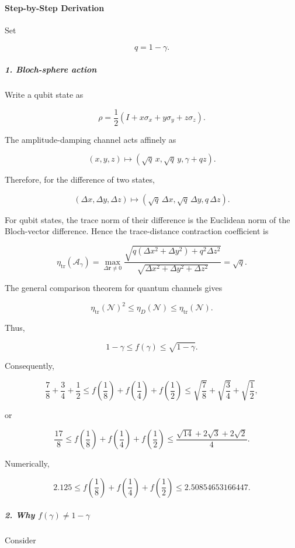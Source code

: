 \documentclass[11pt]{article}
\begin{document}
\paragraph*{Step-by-Step Derivation}

Set

\[
q=1-\gamma.
\]

\subparagraph*{1. Bloch-sphere action}

Write a qubit state as

\[
\rho=\frac12\left(I+x\sigma_x+y\sigma_y+z\sigma_z\right).
\]

The amplitude-damping channel acts affinely as

\[
(x,y,z)\longmapsto \left(\sqrt q\,x,\sqrt q\,y,\gamma+qz\right).
\]

Therefore, for the difference of two states,

\[
(\Delta x,\Delta y,\Delta z) \longmapsto \left(\sqrt q\,\Delta x,\sqrt q\,\Delta y,q\,\Delta z\right).
\]

For qubit states, the trace norm of their difference is the Euclidean norm of the Bloch-vector difference. Hence the trace-distance contraction coefficient is

\[
\eta_{\mathrm{tr}}(\mathcal A_\gamma) = \max_{\Delta\mathbf r\ne0} \frac{\sqrt{q(\Delta x^2+\Delta y^2)+q^2\Delta z^2}} {\sqrt{\Delta x^2+\Delta y^2+\Delta z^2}} =\sqrt q.
\]

The general comparison theorem for quantum channels gives

\[
\eta_{\mathrm{tr}}(\mathcal N)^2 \leq \eta_D(\mathcal N) \leq \eta_{\mathrm{tr}}(\mathcal N).
\]

Thus,

\[
1-\gamma\leq f(\gamma)\leq\sqrt{1-\gamma}.
\]

Consequently,

\[
\frac78+\frac34+\frac12 \leq f\left(\frac18\right)+f\left(\frac14\right)+f\left(\frac12\right) \leq \sqrt{\frac78}+\sqrt{\frac34}+\sqrt{\frac12},
\]

or

\[
{ \frac{17}{8} \leq f\left(\frac18\right)+f\left(\frac14\right)+f\left(\frac12\right) \leq \frac{\sqrt{14}+2\sqrt3+2\sqrt2}{4} }.
\]

Numerically,

\[
2.125 \leq f\left(\frac18\right)+f\left(\frac14\right)+f\left(\frac12\right) \leq 2.50854653166447.
\]

\subparagraph*{2. Why $f(\gamma)\neq1-\gamma$}

Consider
\end{document}
